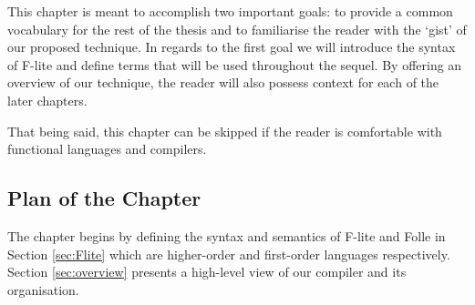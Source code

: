 This chapter is meant to accomplish two important goals: to provide a common
vocabulary for the rest of the thesis and to familiarise the reader with the
`gist' of our proposed technique. In regards to the first goal we will
introduce the syntax of F-lite and define terms that will be used throughout
the sequel. By offering an overview of our technique, the
reader will also possess context for each of the later chapters.

That being said, this chapter can be skipped if the reader is comfortable with
functional languages and compilers.

\subsection*{Plan of the Chapter}

The chapter begins by defining the syntax and semantics of F-lite and Folle in
Section \ref{sec:Flite} which are higher-order and first-order languages
respectively. Section \ref{sec:overview} presents a high-level view of our
compiler and its organisation.
